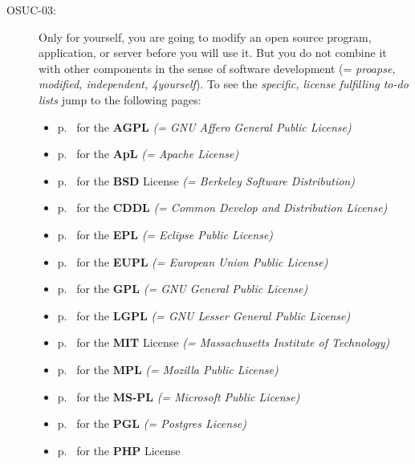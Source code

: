 \begin{description}
\item[OSUC-03:]\label{OSUC-03-DEF} Only for yourself, you are going to modify an
open source program, application, or server before you will use it.
But you do not combine it with other components in the sense of software
development (= \textit{proapse, modified, independent, 4yourself}).
To see the \textit{specific, license fulfilling to-do lists} jump to the
following pages:
   \begin{itemize}
    \item p.\ \pageref{OSUC-03-AGPL} for the \textbf{AGPL}
      \textit{(= GNU Affero General Public License)} 
    \item p.\ \pageref{OSUC-03-Apache20} for the \textbf{ApL}
      \textit{(= Apache License)}
    \item p.\ \pageref{OSUC-03-BSD} for the \textbf{BSD} License
      \textit{(= Berkeley Software Distribution)}
    \item p.\ \pageref{OSUC-03-CDDL} for the \textbf{CDDL}
      \textit{(= Common Develop and Distribution License)}  
    \item p.\ \pageref{OSUC-03-EPL} for the \textbf{EPL}
      \textit{(= Eclipse Public License)}     
    \item p.\ \pageref{OSUC-03-EUPL} for the \textbf{EUPL}
      \textit{(= European Union Public License)} 
    \item p.\ \pageref{OSUC-03-GPL} for the \textbf{GPL}
       \textit{(= GNU General Public License)} 
    \item p.\ \pageref{OSUC-03-LGPL} for the \textbf{LGPL}
      \textit{(= GNU Lesser General Public License)}           
    \item p.\ \pageref{OSUC-03-MIT} for the \textbf{MIT} License
       \textit{(= Massachusetts Institute of Technology)} 
    \item p.\ \pageref{OSUC-03-MPL} for the \textbf{MPL}
      \textit{(= Mozilla Public License)}     
    \item p.\ \pageref{OSUC-03-MS-PL} for the \textbf{MS-PL}
      \textit{(= Microsoft Public License)} 
    \item p.\ \pageref{OSUC-03-PGL} for the \textbf{PGL}
      \textit{(= Postgres License)} 
    \item p.\ \pageref{OSUC-03-PHP} for the \textbf{PHP} License 
  \end{itemize}


\end{description}
